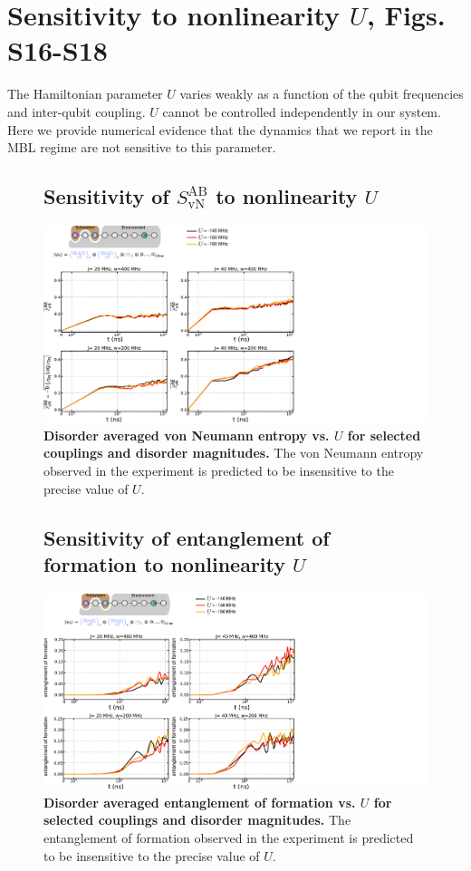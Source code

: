 \section{Sensitivity to nonlinearity $U$, Figs.\,S16-S18}
The Hamiltonian parameter $U$ varies weakly as a function of the qubit frequencies and inter-qubit coupling.
$U$ cannot be controlled independently in our system.
Here we provide numerical evidence that the dynamics that we report in the MBL regime are not sensitive to this parameter.
\begin{figure}
\subsection{Sensitivity of $S_{\text{vN}}^{\text{AB}}$ to nonlinearity $U$}
\centering
\hspace*{20 mm}
\includegraphics[width=200mm, keepaspectratio]{./PDF/eta_svn.pdf}
\caption{\textbf{Disorder averaged von Neumann entropy vs. $U$ for selected couplings and disorder magnitudes.}  The von Neumann entropy observed in the experiment is predicted to be insensitive to the precise value of $U$.}
\end{figure}

\begin{figure}[tbh]
\subsection{Sensitivity of entanglement of formation to nonlinearity $U$}
\centering
\hspace*{20 mm}
\includegraphics[width=200mm, keepaspectratio]{./PDF/eta_eof.pdf}
\caption{
\textbf{Disorder averaged entanglement of formation vs. $U$ for selected couplings and disorder magnitudes.}
The entanglement of formation observed in the experiment is predicted to be insensitive to the precise value of $U$.}
\end{figure}

